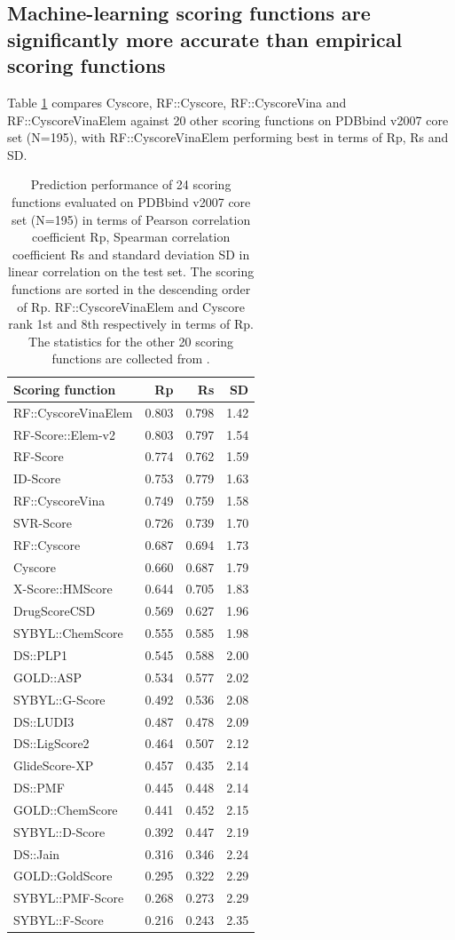 \documentclass[journal=jacsat,manuscript=article]{achemso}
\begin{document}
\subsection{Machine-learning scoring functions are significantly more accurate than empirical scoring functions}

Table \ref{tbl:trn1105tst195} compares Cyscore, RF::Cyscore, RF::CyscoreVina and RF::CyscoreVinaElem against 20 other scoring functions on PDBbind v2007 core set (N=195), with RF::CyscoreVinaElem performing best in terms of Rp, Rs and SD.

\begin{table}[ht]
\caption{Prediction performance of 24 scoring functions evaluated on PDBbind v2007 core set (N=195) in terms of Pearson correlation coefficient Rp, Spearman correlation coefficient Rs and standard deviation SD in linear correlation on the test set. The scoring functions are sorted in the descending order of Rp. RF::CyscoreVinaElem and Cyscore rank 1st and 8th respectively in terms of Rp. The statistics for the other 20 scoring functions are collected from \cite{1362,1370}.}
\label{tbl:trn1105tst195}
\begin{tabular}{lrrr}
\hline
Scoring function & Rp & Rs & SD\\
\hline
RF::CyscoreVinaElem & 0.803 & 0.798 & 1.42\\
RF-Score::Elem-v2 & 0.803 & 0.797 & 1.54 \\
RF-Score & 0.774 & 0.762 & 1.59\\
ID-Score & 0.753 & 0.779 & 1.63\\
RF::CyscoreVina & 0.749 & 0.759 & 1.58\\
SVR-Score & 0.726 & 0.739 & 1.70\\
RF::Cyscore & 0.687 & 0.694 & 1.73\\
Cyscore & 0.660 & 0.687 & 1.79\\
X-Score::HMScore & 0.644 & 0.705 & 1.83\\
DrugScoreCSD & 0.569 & 0.627 & 1.96\\
SYBYL::ChemScore & 0.555 & 0.585 & 1.98\\
DS::PLP1 & 0.545 & 0.588 & 2.00\\
GOLD::ASP & 0.534 & 0.577 & 2.02\\
SYBYL::G-Score & 0.492 & 0.536 & 2.08\\
DS::LUDI3 & 0.487 & 0.478 & 2.09\\
DS::LigScore2 & 0.464 & 0.507 & 2.12\\
GlideScore-XP & 0.457 & 0.435 & 2.14\\
DS::PMF & 0.445 & 0.448 & 2.14\\
GOLD::ChemScore & 0.441 & 0.452 & 2.15\\
SYBYL::D-Score & 0.392 & 0.447 & 2.19\\
DS::Jain & 0.316 & 0.346 & 2.24\\
GOLD::GoldScore & 0.295 & 0.322 & 2.29\\
SYBYL::PMF-Score & 0.268 & 0.273 & 2.29\\
SYBYL::F-Score & 0.216 & 0.243 & 2.35\\
\hline
\end{tabular}
\end{table}
\end{document}
